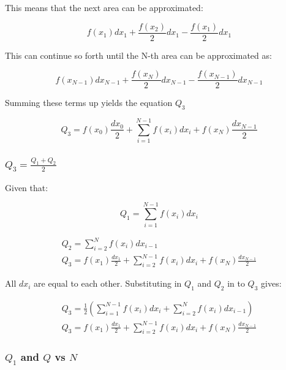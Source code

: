 \documentclass[12pt]{article}
\begin{document}
				This means that the next area can be approximated:
				
				$$
				f\left(x_{1}\right) d x_{1}+\frac{f\left(x_{2}\right)}{2} d x_{1}-\frac{f\left(x_{1}\right)}{2} d x_{1}
				$$
				
				This can continue so forth until the $\mathrm{N}$-th area can be approximated as:
				
				$$
				f\left(x_{N-1}\right) d x_{N-1}+\frac{f\left(x_{N}\right)}{2} d x_{N-1}-\frac{f\left(x_{N-1}\right)}{2} d x_{N-1}
				$$
				
				Summing these terms up yields the equation $Q_{3}$
				
				$$
				Q_{3}=f\left(x_{0}\right) \frac{d x_{0}}{2}+\sum_{i=1}^{N-1} f\left(x_{i}\right) d x_{i}+f\left(x_{N}\right) \frac{d x_{N-1}}{2}
				$$
			\subsubsection{$Q_{3} = \frac{Q_{1} + Q_{2}}{2}$}				
				Given that:
				
				$$
				Q_{1}=\sum_{i=1}^{N-1} f\left(x_{i}\right) d x_{i}
				$$
				
				$$
				\begin{gathered}
					Q_{2}=\sum_{i=2}^{N} f\left(x_{i}\right) d x_{i-1} \\
					Q_{3}=f\left(x_{1}\right) \frac{d x_{1}}{2}+\sum_{i=2}^{N-1} f\left(x_{i}\right) d x_{i}+f\left(x_{N}\right) \frac{d x_{N-1}}{2}
				\end{gathered}
				$$
				
				All $d x_{i}$ are equal to each other. Substituting in $Q_{1}$ and $Q_{2}$ in to $Q_{3}$ gives:
				
				$$
				\begin{gathered}
					Q_{3}=\frac{1}{2}\left(\sum_{i=1}^{N-1} f\left(x_{i}\right) d x_{i}+\sum_{i=2}^{N} f\left(x_{i}\right) d x_{i-1}\right) \\
					Q_{3}=f\left(x_{1}\right) \frac{d x_{1}}{2}+\sum_{i=2}^{N-1} f\left(x_{i}\right) d x_{i}+f\left(x_{N}\right) \frac{d x_{N-1}}{2}
				\end{gathered}
				$$
			\newpage
			\subsubsection{$Q_{1}$ and $Q$ vs $N$}
				
				
				
\end{document}
